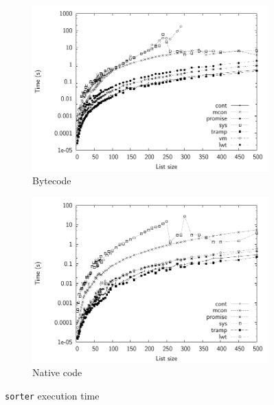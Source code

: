 \documentclass[12pt,twoside,notitlepage]{report}
\begin{document}
\begin{figure}[h]
\centering
\begin{subfigure}[b]{0.45\linewidth}
\includegraphics[width=\linewidth]{./sorter_exec_times_bw}
\caption{Bytecode}
\label{fig:sorter_exec_times_bc}
\end{subfigure}
\begin{subfigure}[b]{0.45\linewidth}
\includegraphics[width=\linewidth]{./sorter_exec_times_opt_bw}
\caption{Native code}
\label{fig:sorter_exec_times_nat}
\end{subfigure}
\cprotect\caption{\verb|sorter| execution time}
\label{fig:sorter_exec_times}
\end{figure}
\end{document}
